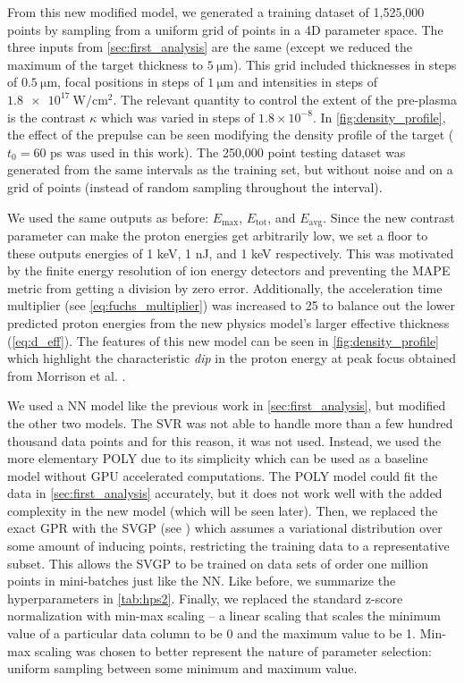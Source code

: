 From this new modified model, we generated a training dataset of 1,525,000 points by sampling from a uniform grid of points in a 4D parameter space. The three inputs from \autoref{sec:first_analysis} are the same (except we reduced the maximum of the target thickness to $\SI{5}{\micro \meter}$). This grid included thicknesses in steps of $\SI{0.5}{\micro \meter}$, focal positions in steps of $\SI{1}{\micro \meter}$ and intensities in steps of $\SI{1.8e17}{\watt \per \centi \meter \squared}$. The relevant quantity to control the extent of the pre-plasma is the contrast $\kappa$ which was varied in steps of $1.8 \times 10^{-8}$. In \autoref{fig:density_profile}, the effect of the prepulse can be seen modifying the density profile of the target ($t_0 = 60$ ps was used in this work). The 250,000 point testing dataset was generated from the same intervals as the training set, but without noise and on a grid of points (instead of random sampling throughout the interval).

We used the same outputs as before: $E_\text{max}$, $E_\text{tot}$, and $E_\text{avg}$. Since the new contrast parameter can make the proton energies get arbitrarily low, we set a floor to these outputs energies of 1 keV, 1 nJ, and 1 keV respectively. This was motivated by the finite energy resolution of ion energy detectors and preventing the \gls{MAPE} metric from getting a division by zero error. Additionally, the acceleration time multiplier (see \autoref{eq:fuchs_multiplier}) was increased to 25 to balance out the lower predicted proton energies from the new physics model's larger effective thickness (\autoref{eq:d_eff}). The features of this new model can be seen in \autoref{fig:density_profile} which highlight the characteristic \emph{dip} in the proton energy at peak focus obtained from Morrison et al. \cite{Morrison_2018_NJoP}.

We used a \gls{NN} model like the previous work in \autoref{sec:first_analysis}, but modified the other two models. The \gls{SVR} was not able to handle more than a few hundred thousand data points and for this reason, it was not used. Instead, we used the more elementary \gls{POLY} due to its simplicity which can be used as a baseline model without \gls{GPU} accelerated computations. The \gls{POLY} model could fit the data in \autoref{sec:first_analysis} accurately, but it does not work well with the added complexity in the new model (which will be seen later). Then, we replaced the exact \gls{GPR} with the \gls{SVGP} (see \cite{Hensman_2014_SVGP}) which assumes a variational distribution over some amount of inducing points, restricting the training data to a representative subset. This allows the \gls{SVGP} to be trained on data sets of order one million points in mini-batches just like the \gls{NN}. Like before, we summarize the hyperparameters in \autoref{tab:hps2}.  Finally, we replaced the standard z-score normalization with min-max scaling -- a linear scaling that scales the minimum value of a particular data column to be 0 and the maximum value to be 1. Min-max scaling was chosen to better represent the nature of parameter selection: uniform sampling between some minimum and maximum value.

